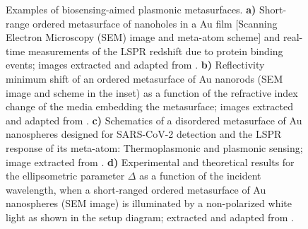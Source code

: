 \begin{figure}[h!]
\centering
\hspace*{-3.5em}%
  \vspace*{-1.75em}
  \caption[Backgrounds]{Examples of biosensing-aimed plasmonic metasurfaces. \textbf{a)} Short-range ordered metasurface of nanoholes in a Au film [Scanning Electron Microscopy (SEM) image and meta-atom scheme] and real-time measurements of the LSPR redshift due to protein binding events; images extracted and adapted from \cite{feuz_improving_2010}. \textbf{b) } Reflectivity minimum shift of an ordered metasurface of Au nanorods (SEM image and scheme in the inset) as a function of the refractive index change of the media embedding the metasurface; images extracted and adapted from \cite{kabashin_plasmonic_2009}. \textbf{c)} Schematics of a disordered metasurface of Au nanospheres designed for SARS-CoV-2 detection and the LSPR response of its meta-atom: Thermoplasmonic and plasmonic sensing; image extracted from \cite{qiu_dual_2020}. \textbf{d)} Experimental and theoretical results for the ellipsometric parameter $\Delta$ as a function of the incident wavelength, when a short-ranged ordered metasurface of Au nanospheres (SEM image) is illuminated by a  non-polarized white light as shown in the setup diagram; extracted and adapted from \cite{svedendahl_refractometric_2014}.
  }
\label{fig:Back}
\end{figure}

